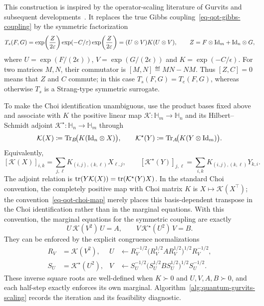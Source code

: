 This construction is inspired by the operator-scaling literature of Gurvits and subsequent developments~\cite{gurvits2003classical,gurvits2004classical,georgiou2015positive,garg2018recent}. It replaces the true Gibbs coupling~\eqref{eq-qot-gibbs-coupling} by the symmetric factorization
\begin{equation}\label{eq-qot-symmetric-scaling}
	T_s(F,G)
	=
	\exp\!\left(\frac{Z}{2\varepsilon}\right)\exp(-C/\varepsilon)\exp\!\left(\frac{Z}{2\varepsilon}\right)
	=
	(U\otimes V)K(U\otimes V),
	\qquad
	Z=F\otimes\mathrm{Id}_m+\mathrm{Id}_n\otimes G,
\end{equation}
where $U=\exp(F/(2\epsilon))$, $V=\exp(G/(2\epsilon))$ and $K=\exp(-C/\epsilon)$. For two matrices $M,N$, their commutator is $[M,N]\eqdef MN-NM$. Thus $[Z,C]=0$ means that $Z$ and $C$ commute; in this case $T_s(F,G)=T_e(F,G)$, whereas otherwise $T_s$ is a Strang-type symmetric surrogate.

To make the Choi identification unambiguous, use the product bases fixed above and associate with $K$ the positive linear map $\mathcal K:\mathbb H_m\to\mathbb H_n$ and its Hilbert--Schmidt adjoint $\mathcal K^\star:\mathbb H_n\to\mathbb H_m$ through
\begin{equation}\label{eq-qot-choi-map}
	\mathcal K(X)
	\coloneqq
	\operatorname{Tr}_B\!\bigl(K(\mathrm{Id}_n\otimes X)\bigr),
	\qquad
	\mathcal K^\star(Y)
	\coloneqq
	\operatorname{Tr}_A\!\bigl(K(Y\otimes\mathrm{Id}_m)\bigr).
\end{equation}
Equivalently,
\[
	[\mathcal K(X)]_{i,k}
	=
	\sum_{j,\ell}K_{(i,j),(k,\ell)}X_{\ell,j},
	\qquad
	[\mathcal K^\star(Y)]_{j,\ell}
	=
	\sum_{i,k}K_{(i,j),(k,\ell)}Y_{k,i}.
\]
The adjoint relation is $\operatorname{tr}(Y\mathcal K(X))=\operatorname{tr}(\mathcal K^\star(Y)X)$. In the standard Choi convention, the completely positive map with Choi matrix $K$ is $X\mapsto\mathcal K(X^\top)$; the convention~\eqref{eq-qot-choi-map} merely places this basis-dependent transpose in the Choi identification rather than in the marginal equations. With this convention, the marginal equations for the symmetric coupling are exactly
\[
	U\,\mathcal K(V^2)\,U=A,
	\qquad
	V\,\mathcal K^\star(U^2)\,V=B.
\]
They can be enforced by the explicit congruence normalizations
\begin{equation}\label{eq-qot-gurvits-updates}
\begin{aligned}
	R_V&=\mathcal K(V^2),
	&
	U&\leftarrow
	R_V^{-1/2}\bigl(R_V^{1/2} A R_V^{1/2}\bigr)^{1/2}R_V^{-1/2},
	\\
	S_U&=\mathcal K^\star(U^2),
	&
	V&\leftarrow
	S_U^{-1/2}\bigl(S_U^{1/2} B S_U^{1/2}\bigr)^{1/2}S_U^{-1/2}.
\end{aligned}
\end{equation}
These inverse square roots are well-defined when $K\succ0$ and $U,V,A,B\succ0$, and each half-step exactly enforces its own marginal. Algorithm~\ref{alg:quantum-gurvits-scaling} records the iteration and its feasibility diagnostic.

